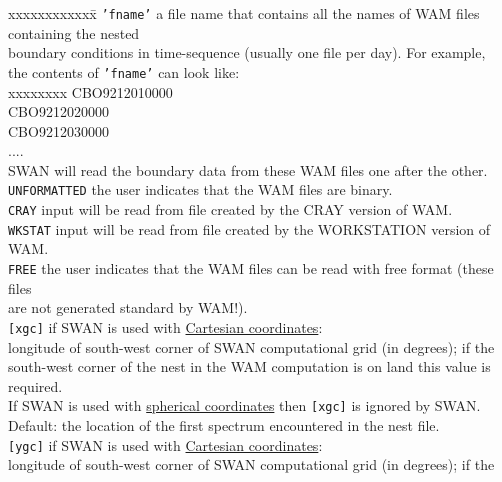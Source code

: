 \documentclass[12pt]{book}
\begin{document}
\begin{tabbing}
xxxxxxxxxxxx\= \kill
{\tt {'fname'}}   \> a file name that contains all the names of WAM files containing the nested\+\\
                     boundary conditions in time-sequence (usually one file per day). For example,\\
                     the contents of {\tt {'fname'}} can look like:\\
                     \pushtabs
                      xxxxxxxx \kill
                       CBO9212010000\\
                       CBO9212020000\\
                       CBO9212030000\\
                       ....\\
                     \poptabs
                     SWAN will read the boundary data from these WAM files one after the other.\-\\
{\tt UNFORMATTED} \> the user indicates that the WAM files are binary.\\
{\tt CRAY}        \> input will be read from file created by the CRAY version of WAM.\\
{\tt WKSTAT}      \> input will be read from file created by the WORKSTATION version of WAM.\\
{\tt FREE}        \> the user indicates that the WAM files can be read with free format (these files\+\\
                     are not generated standard by WAM!).\-\\
{\tt [xgc]}       \> if SWAN is used with \underline{Cartesian coordinates}:\+\\
                     longitude of south-west corner of SWAN computational grid (in degrees); if the\\
                     south-west corner of the nest in the WAM computation is on land this value is\\
                     required.\\
                     If SWAN is used with \underline{spherical coordinates} then {\tt [xgc]} is ignored by SWAN.\\
                     Default: the location of the first spectrum encountered in the nest file.\-\\
{\tt [ygc]}       \> if SWAN is used with \underline{Cartesian coordinates}:\+\\
                     longitude of south-west corner of SWAN computational grid (in degrees); if the\\

\end{tabbing}
\end{document}
